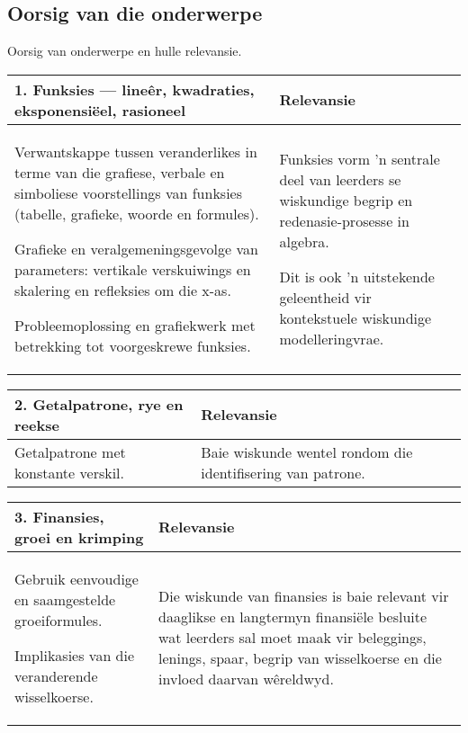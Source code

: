 \subsection{Oorsig van die onderwerpe}
Oorsig van onderwerpe en hulle relevansie.

\begin{table}[H]
  \begin{center} 
    \begin{tabular}{|p{8.5cm}|p{3.5cm}|} \hline
\textbf{1. Funksies --- line\^{e}r, kwadraties, eksponensi\"{e}el, rasioneel} &
\textbf{Relevansie}  \\ \hline  
Verwantskappe tussen veranderlikes in terme van die grafiese, verbale
en simboliese voorstellings van funksies (tabelle, grafieke, woorde en
formules).\par
Grafieke en veralgemeningsgevolge van parameters: vertikale
verskuiwings en skalering en refleksies om die x-as.\par
Probleemoplossing en grafiekwerk met betrekking tot voorgeskrewe funksies.
&
Funksies vorm 'n sentrale deel van leerders se wiskundige begrip en
redenasie-prosesse in algebra.\par
Dit is ook 'n uitstekende geleentheid vir kontekstuele wiskundige
modelleringvrae. \\ \hline
    \end{tabular}
  \end{center}
\end{table}

\begin{table}[H]
\begin{center} 
\begin{tabular}{|p{8.5cm}|p{3.5cm}|} \hline
\textbf{2. Getalpatrone, rye en reekse}&\textbf{Relevansie} \\ \hline  
Getalpatrone met konstante verskil.
&
Baie wiskunde wentel rondom die identifisering van patrone.
\\ \hline
 \end{tabular}
\end{center}
\end{table}

\begin{table}[H]
\begin{center} 
\begin{tabular}{|p{8.5cm}|p{3.5cm}|} \hline
\textbf{3. Finansies, groei en krimping}& \textbf{Relevansie} \\ \hline  
Gebruik eenvoudige en saamgestelde groeiformules.\par
Implikasies van die veranderende wisselkoerse.
&
Die wiskunde van finansies is baie relevant vir daaglikse en
langtermyn finansi\"{e}le besluite wat leerders sal moet maak vir
beleggings, lenings, spaar, begrip van wisselkoerse en die invloed
daarvan w\^{e}reldwyd.
\\ \hline

 \end{tabular}
\end{center}
\end{table}

